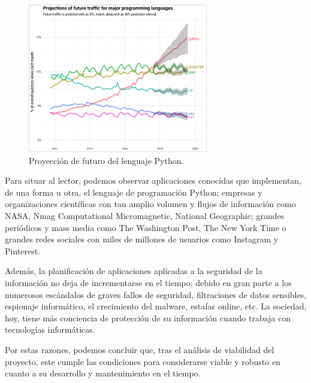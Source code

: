 \documentclass[a4paper, 11pt, titlepage]{article}
\begin{document}
        \begin{figure}[htp]
            \centering
            \includegraphics[width=0.7\textwidth]{resources/py02.png}
            \caption{Proyección de futuro del lenguaje Python.}
            \label{py02}
        \end{figure}
    
        Para situar al lector, podemos observar aplicaciones conocidas que implementan, 
        de una forma u otra, el lenguaje de programación Python; empresas y 
        organizaciones científicas con tan amplio volumen y flujos de información como 
        NASA, Nmag Computational Micromagnetic, National Geographic; grandes periódicos 
        y mass media como The Washington Post, The New York Time o grandes redes sociales 
        con miles de millones de usuarios como Instagram y Pinterest.

        Además, la planificación de aplicaciones aplicadas a la seguridad de la 
        información no deja de incrementarse en el tiempo; debido en gran parte a 
        los numerosos escándalos de graves fallos de seguridad, filtraciones de datos 
        sensibles, espionaje informático, el crecimiento del malware, estafas online, 
        etc. La sociedad, hoy, tiene más conciencia de protección de su información 
        cuando trabaja con tecnologías informáticas.

        Por estas razones, podemos concluir que, tras el análisis de viabilidad del proyecto, 
        este cumple las condiciones para considerarse viable y robusto en cuanto a su desarrollo 
        y mantenimiento en el tiempo.
\end{document}

